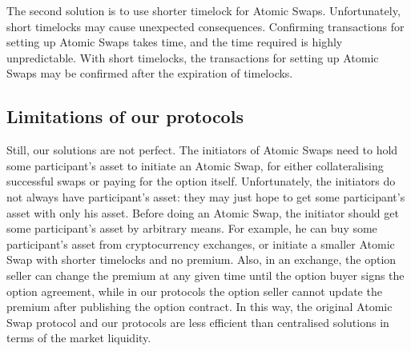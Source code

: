 The second solution is to use shorter timelock for Atomic Swaps.
Unfortunately, short timelocks may cause unexpected consequences.
Confirming transactions for setting up Atomic Swaps takes time, and the time required is highly unpredictable.
With short timelocks, the transactions for setting up Atomic Swaps may be confirmed after the expiration of timelocks.

\subsection{Limitations of our protocols}

Still, our solutions are not perfect.
The initiators of Atomic Swaps need to hold some participant's asset to initiate an Atomic Swap,
for either collateralising successful swaps or paying for the option itself.
Unfortunately, the initiators do not always have participant's asset: they may just hope to get some participant's asset with only his asset.
Before doing an Atomic Swap, the initiator should get some participant's asset by arbitrary means.
For example, he can buy some participant's asset from cryptocurrency exchanges, or initiate a smaller Atomic Swap with shorter timelocks and no premium.
Also, in an exchange, the option seller can change the premium at any given time until the option buyer signs the option agreement, while in our protocols the option seller cannot update the premium after publishing the option contract.
In this way, the original Atomic Swap protocol and our protocols are less efficient than centralised solutions in terms of the market liquidity.